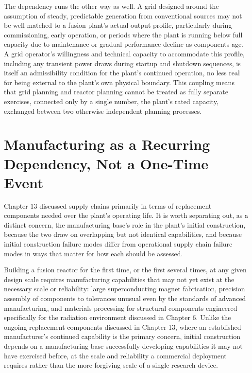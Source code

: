 The dependency runs the other way as well. A grid designed around the assumption of steady, predictable generation from conventional sources may not be well matched to a fusion plant's actual output profile, particularly during commissioning, early operation, or periods where the plant is running below full capacity due to maintenance or gradual performance decline as components age. A grid operator's willingness and technical capacity to accommodate this profile, including any transient power draws during startup and shutdown sequences, is itself an admissibility condition for the plant's continued operation, no less real for being external to the plant's own physical boundary. This coupling means that grid planning and reactor planning cannot be treated as fully separate exercises, connected only by a single number, the plant's rated capacity, exchanged between two otherwise independent planning processes.

\section{Manufacturing as a Recurring Dependency, Not a One-Time Event}

Chapter 13 discussed supply chains primarily in terms of replacement components needed over the plant's operating life. It is worth separating out, as a distinct concern, the manufacturing base's role in the plant's initial construction, because the two draw on overlapping but not identical capabilities, and because initial construction failure modes differ from operational supply chain failure modes in ways that matter for how each should be assessed.

Building a fusion reactor for the first time, or the first several times, at any given design scale requires manufacturing capabilities that may not yet exist at the necessary scale or reliability: large superconducting magnet fabrication, precision assembly of components to tolerances unusual even by the standards of advanced manufacturing, and materials processing for structural components engineered specifically for the radiation environment discussed in Chapter 6. Unlike the ongoing replacement components discussed in Chapter 13, where an established manufacturer's continued capability is the primary concern, initial construction depends on a manufacturing base successfully developing capabilities it may not have exercised before, at the scale and reliability a commercial deployment requires rather than the more forgiving scale of a single research device.

